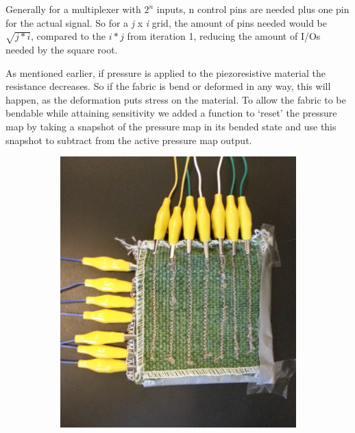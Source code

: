 Generally for a multiplexer with \(2^n\) inputs, n control pins are needed plus one pin for the actual signal.
So for a \emph{j} x \emph{i} grid, the amount of pins needed would be \(\sqrt{j*i}\), compared to the \(i*j\) from iteration 1, reducing the amount of I/Os needed by the square root.

As mentioned earlier, if pressure is applied to the piezoresistive material the resistance decreases.
So if the fabric is bend or deformed in any way, this will happen, as the deformation puts stress on the material.
To allow the fabric to be bendable while attaining sensitivity we added a function to `reset' the pressure map by taking a snapshot of the pressure map in its bended state and use this snapshot to subtract from the active pressure map output.

\begin{figure}[h]
\centering
\begin{subfigure}[t]{.44\textwidth}
  \centering
  \includegraphics[width=\linewidth]{figures/touch/proto2_1}
\end{subfigure}%
\hspace{0.02\textwidth}
\begin{subfigure}[t]{.44\textwidth}

\end{subfigure}
\end{figure}
